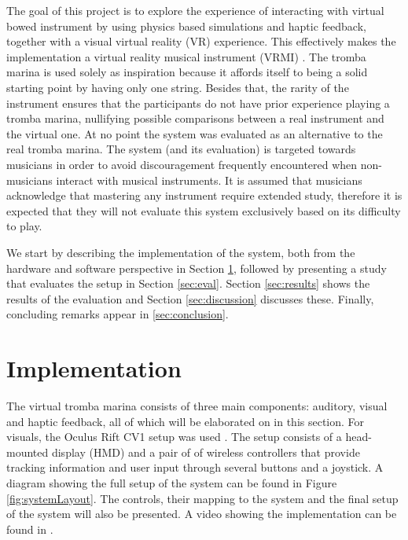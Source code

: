 \documentclass[dvipsnames, pdftex]{article}
\begin{document}
The goal of this project is to explore the experience of interacting with virtual bowed instrument by using physics based simulations and haptic feedback, together with a visual virtual reality (VR) experience. This effectively makes the implementation a virtual reality musical instrument (VRMI) \cite{Serafin2016}. The tromba marina is used solely as inspiration because it affords itself to being a solid starting point by having only one string. Besides that, the rarity of the instrument ensures that the participants do not have prior experience playing a tromba marina, nullifying possible comparisons between a real instrument and the virtual one. At no point the system was evaluated as an alternative to the real tromba marina. The system (and its evaluation) is targeted towards musicians in order to avoid discouragement frequently encountered when non-musicians interact with musical instruments. It is assumed that musicians acknowledge that mastering any instrument require extended study, therefore it is expected that they will not evaluate this system exclusively based on its difficulty to play.

We start by describing the implementation of the system, both from the hardware and software perspective in Section \ref{sec:implementation}, followed by presenting a study that evaluates the setup in Section \ref{sec:eval}. Section \ref{sec:results} shows the results of the evaluation and Section \ref{sec:discussion} discusses these. Finally, concluding remarks appear in \ref{sec:conclusion}.

\section{Implementation}\label{sec:implementation}
The virtual tromba marina consists of three main components: auditory, visual and haptic feedback, all of which will be elaborated on in this section. For visuals, the Oculus Rift CV1 setup was used \cite{Oculus2020}. The setup consists of a head-mounted display (HMD) and a pair of of wireless controllers that provide tracking information and user input through several buttons and a joystick. A diagram showing the full setup of the system can be found in Figure \ref{fig:systemLayout}. The controls, their mapping to the system and the final setup of the system will also be presented. A video showing the implementation can be found in \cite{Trombavideo2020}.
\end{document}
